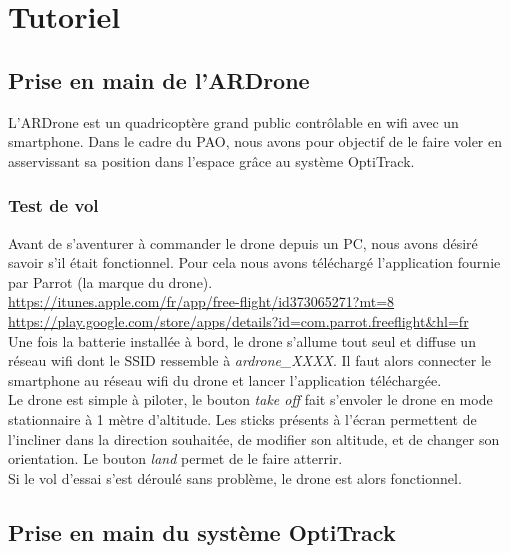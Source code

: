 \chapter{Tutoriel}
\section{Prise en main de l'ARDrone}
L'ARDrone est un quadricoptère grand public contrôlable en wifi avec un smartphone. Dans le cadre du PAO, nous avons pour objectif de le faire voler en asservissant sa position dans l'espace grâce au système OptiTrack.
\subsection{Test de vol}
Avant de s'aventurer à commander le drone depuis un PC, nous avons désiré savoir s'il était fonctionnel. Pour cela nous avons téléchargé l'application fournie par Parrot (la marque du drone).\\
\url{https://itunes.apple.com/fr/app/free-flight/id373065271?mt=8}\\
\url{https://play.google.com/store/apps/details?id=com.parrot.freeflight&hl=fr}\\
Une fois la batterie installée à bord, le drone s'allume tout seul et diffuse un réseau wifi dont le SSID ressemble à \textit{ardrone\_XXXX}. Il faut alors connecter le smartphone au réseau wifi du drone et lancer l'application téléchargée.\\
Le drone est simple à piloter, le bouton \textit{take off} fait s'envoler le drone en mode stationnaire à 1 mètre d'altitude. Les sticks présents à l'écran permettent de l'incliner dans la direction souhaitée, de modifier son altitude, et de changer son orientation. Le bouton \textit{land} permet de le faire atterrir.\\
Si le vol d'essai s'est déroulé sans problème, le drone est alors fonctionnel.



\section{Prise en main du système OptiTrack}